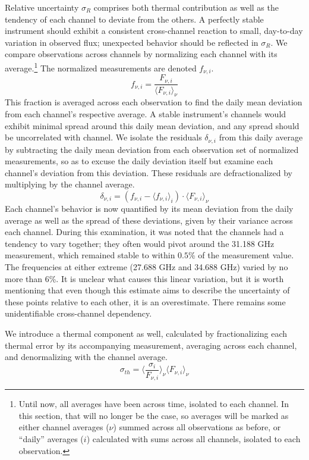 \documentclass{article}
\begin{document}
	Relative uncertainty $\sigma_{R}$ comprises both thermal contribution as well as the tendency of each channel to deviate from the others.
	A perfectly stable instrument should exhibit a consistent cross-channel reaction to small, day-to-day variation in observed flux; unexpected behavior should be reflected in $\sigma_{R}$.
	We compare observations across channels by normalizing each channel with its average.\footnote{Until now, all averages have been across time, isolated to each channel.
	In this section, that will no longer be the case, so averages will be marked as either channel averages ($\nu$) summed across all observations as before, or ``daily'' averages ($i$) calculated with sums across all channels, isolated to each observation.}
	The normalized measurements are denoted $f_{\nu, i}$.
	$$ f_{\nu, i} = \frac{F_{\nu, i}}{\langle F_{\nu, i} \rangle_{\nu}} $$
	This fraction is averaged across each observation to find the daily mean deviation from each channel's respective average.
	A stable instrument's channels would exhibit minimal spread around this daily mean deviation, and any spread should be uncorrelated with channel.
	We isolate the residuals $\delta_{\nu, i}$ from this daily average by subtracting the daily mean deviation from each observation set of normalized measurements, so as to excuse the daily deviation itself but examine each channel's deviation from this deviation.
	These residuals are defractionalized by multiplying by the channel average.
	$$ \delta_{\nu, i} = (f_{\nu, i} - \langle f_{\nu, i} \rangle_{i}) \cdot \langle F_{\nu, i} \rangle_{\nu} $$
	Each channel's behavior is now quantified by its mean deviation from the daily average as well as the spread of these deviations, given by their variance across each channel.
	During this examination, it was noted that the channels had a tendency to vary together; they often would pivot around the 31.188 GHz measurement, which remained stable to within $0.5$\% of the measurement value.
	The frequencies at either extreme (27.688 GHz and 34.688 GHz) varied by no more than 6\%.
	It is unclear what causes this linear variation, but it is worth mentioning that even though this estimate aims to describe the uncertainty of these points relative to each other, it is an overestimate.
	There remains some unidentifiable cross-channel dependency.

	We introduce a thermal component as well, calculated by fractionalizing each thermal error by its accompanying measurement, averaging across each channel, and denormalizing with the channel average.
	$$\sigma_{th} = \Bigg\langle \frac{\sigma_{i}}{F_{\nu,i}} \Bigg\rangle_{\nu} \langle F_{\nu, i} \rangle_{\nu} $$
\end{document}
